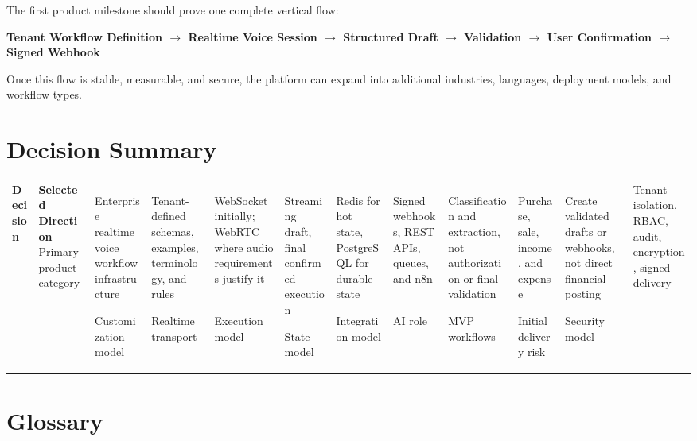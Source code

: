 \documentclass[11pt,a4paper]{article}
\begin{document}
The first product milestone should prove one complete vertical flow:

\begin{center}
\textbf{
Tenant Workflow Definition
$\rightarrow$
Realtime Voice Session
$\rightarrow$
Structured Draft
$\rightarrow$
Validation
$\rightarrow$
User Confirmation
$\rightarrow$
Signed Webhook
}
\end{center}

Once this flow is stable, measurable, and secure, the platform can expand
into additional industries, languages, deployment models, and workflow
types.

\appendix

\section{Decision Summary}

\begin{tabularx}{\textwidth}{L{53mm}Y}
\toprule
\textbf{Decision} & \textbf{Selected Direction} \
\midrule
Primary product category
& Enterprise realtime voice workflow infrastructure \

Customization model
& Tenant-defined schemas, examples, terminology, and rules \

Realtime transport
& WebSocket initially; WebRTC where audio requirements justify it \

Execution model
& Streaming draft, final confirmed execution \

State model
& Redis for hot state, PostgreSQL for durable state \

Integration model
& Signed webhooks, REST APIs, queues, and n8n \

AI role
& Classification and extraction, not authorization or final validation \

MVP workflows
& Purchase, sale, income, and expense \

Initial delivery risk
& Create validated drafts or webhooks, not direct financial posting \

Security model
& Tenant isolation, RBAC, audit, encryption, signed delivery \
\bottomrule
\end{tabularx}

\section{Glossary}
\end{document}
